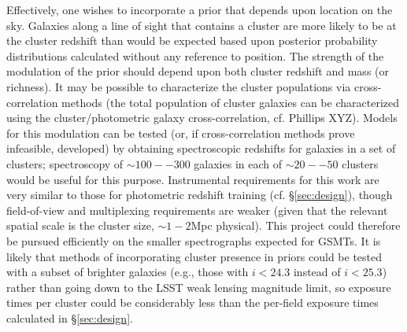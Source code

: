 Effectively, one wishes to incorporate a prior that depends upon location on the sky.  Galaxies along a line of sight that contains a cluster are more likely to be at the cluster redshift than would be expected based upon posterior probability distributions calculated without any reference to position.   The strength of the modulation of the prior should depend upon both cluster redshift and mass (or richness).  It may be possible to characterize the cluster populations via cross-correlation methods (the total population of cluster galaxies can be characterized using the cluster/photometric galaxy cross-correlation, cf. Phillips XYZ).  Models for this modulation can be tested (or, if cross-correlation methods prove infeasible, developed) by obtaining spectroscopic redshifts for galaxies in a set of clusters; spectroscopy of $\sim 100--300$ galaxies in each of $\sim 20--50$ clusters would be useful for this purpose.  Instrumental requirements for this work are very similar to those for photometric redshift training (cf. \S \ref{sec:design}), though field-of-view and multiplexing requirements are weaker (given that the relevant spatial scale is the cluster size, $\sim 1-2$Mpc physical).  This project could therefore be pursued efficiently on the smaller spectrographs expected for GSMTs.  It is likely that methods of incorporating cluster presence in priors could be tested with a subset of brighter galaxies (e.g., those with $i<24.3$ instead of $i<25.3$) rather than going down to the LSST weak lensing magnitude limit, so exposure times per cluster could be considerably less than the per-field exposure times calculated in \S \ref{sec:design}.


%
%
